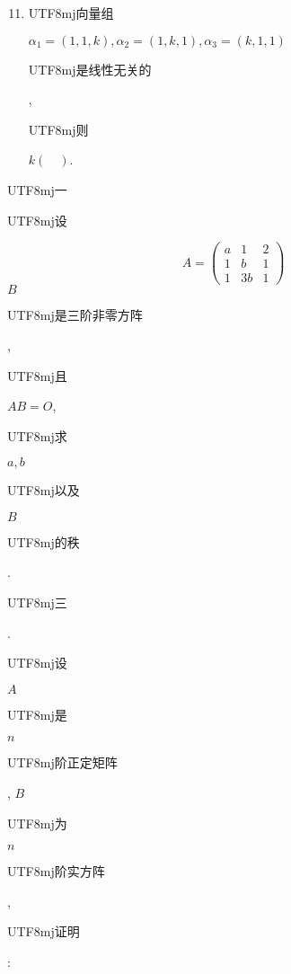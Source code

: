 \documentclass[10pt]{article}
\begin{document}
\begin{enumerate}
  \setcounter{enumi}{10}
  \item \begin{CJK}{UTF8}{mj}向量组\end{CJK} $\alpha_{1}=(1,1, k), \alpha_{2}=(1, k, 1), \alpha_{3}=(k, 1,1)$ \begin{CJK}{UTF8}{mj}是线性无关的\end{CJK}, \begin{CJK}{UTF8}{mj}则\end{CJK} $k(\quad)$.
\end{enumerate}
\begin{CJK}{UTF8}{mj}一\end{CJK} \begin{CJK}{UTF8}{mj}设\end{CJK}
$$
A=\left(\begin{array}{ccc}
a & 1 & 2 \\
1 & b & 1 \\
1 & 3 b & 1
\end{array}\right)
$$
$B$ \begin{CJK}{UTF8}{mj}是三阶非零方阵\end{CJK}, \begin{CJK}{UTF8}{mj}且\end{CJK} $A B=O$, \begin{CJK}{UTF8}{mj}求\end{CJK} $a, b$ \begin{CJK}{UTF8}{mj}以及\end{CJK} $B$ \begin{CJK}{UTF8}{mj}的秩\end{CJK}.

\begin{CJK}{UTF8}{mj}三\end{CJK}. \begin{CJK}{UTF8}{mj}设\end{CJK} $A$ \begin{CJK}{UTF8}{mj}是\end{CJK} $n$ \begin{CJK}{UTF8}{mj}阶正定矩阵\end{CJK}, $B$ \begin{CJK}{UTF8}{mj}为\end{CJK} $n$ \begin{CJK}{UTF8}{mj}阶实方阵\end{CJK}, \begin{CJK}{UTF8}{mj}证明\end{CJK}:
\end{document}
